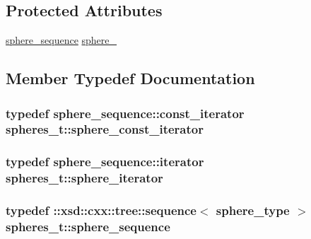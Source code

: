 \subsection*{Protected Attributes}
\begin{DoxyCompactItemize}
\item 
\hyperlink{classspheres__t_ae9b4b35c1b290ab0ce8724f773d3b553}{sphere\-\_\-sequence} \hyperlink{classspheres__t_a7320f40830f4d91ea94e0ae95ccbb4e0}{sphere\-\_\-}
\end{DoxyCompactItemize}


\subsection{Member Typedef Documentation}
\hypertarget{classspheres__t_ac87f4dc7dafc3f09566e157ef3cf9985}{
\subsubsection[{sphere\-\_\-const\-\_\-iterator}]{\setlength{\rightskip}{0pt plus 5cm}typedef sphere\-\_\-sequence\-::const\-\_\-iterator {\bf spheres\-\_\-t\-::sphere\-\_\-const\-\_\-iterator}}}\label{classspheres__t_ac87f4dc7dafc3f09566e157ef3cf9985}
\hypertarget{classspheres__t_a9c45b4a3d0428ab6cb8e7a5d7baf06aa}{
\subsubsection[{sphere\-\_\-iterator}]{\setlength{\rightskip}{0pt plus 5cm}typedef sphere\-\_\-sequence\-::iterator {\bf spheres\-\_\-t\-::sphere\-\_\-iterator}}}\label{classspheres__t_a9c45b4a3d0428ab6cb8e7a5d7baf06aa}
\hypertarget{classspheres__t_ae9b4b35c1b290ab0ce8724f773d3b553}{
\subsubsection[{sphere\-\_\-sequence}]{\setlength{\rightskip}{0pt plus 5cm}typedef \-::xsd\-::cxx\-::tree\-::sequence$<$ {\bf sphere\-\_\-type} $>$ {\bf spheres\-\_\-t\-::sphere\-\_\-sequence}}}\label{classspheres__t_ae9b4b35c1b290ab0ce8724f773d3b553}
